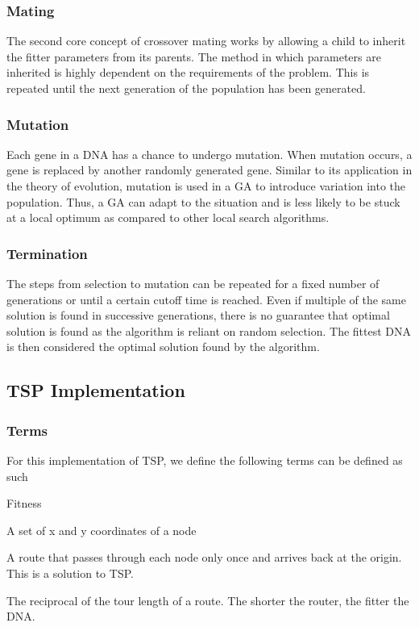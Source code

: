 \documentclass[sigconf]{acmart}
\begin{document}
\subsubsection{Mating}
The second core concept of crossover mating works by allowing a child to inherit the fitter parameters from its parents. The method in which parameters are inherited is highly dependent on the requirements of the problem. This is repeated until the next generation of the population has been generated. 

\subsubsection{Mutation}
Each gene in a DNA has a chance to undergo mutation. When mutation occurs, a gene is replaced by another randomly generated gene. Similar to its application in the theory of evolution, mutation is used in a GA to introduce variation into the population. Thus, a GA can adapt to the situation and is less likely to be stuck at a local optimum as compared to other local search algorithms.

\subsubsection{Termination}
The steps from selection to mutation can be repeated for a fixed number of generations or until a certain cutoff time is reached. Even if multiple of the same solution is found in successive generations, there is no guarantee that optimal solution is found as the algorithm is reliant on random selection. The fittest DNA is then considered the optimal solution found by the algorithm.

\subsection{TSP Implementation}
\subsubsection{Terms}
For this implementation of TSP, we define the following terms can be defined as such
\begin{labeling}{Fitness\quad}
  \item[Gene] A set of x and y coordinates of a node 
  \item[DNA] A route that passes through each node only once and arrives back at the origin. This is a solution to TSP.
  \item[Fitness] The reciprocal of the tour length of a route. The shorter the router, the fitter the DNA.
\end{labeling}
\end{document}

